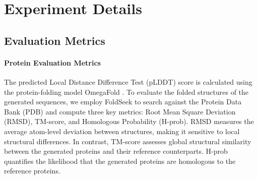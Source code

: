 


\section{Experiment Details}
\subsection{Evaluation Metrics}\label{sec:appendix-metrics}
\paragraph{Protein Evaluation Metrics}
The predicted Local Distance Difference Test (pLDDT) score is calculated using the protein-folding model OmegaFold \citep{OmegaFold}. To evaluate the folded structures of the generated sequences, we employ FoldSeek \citep{vanKempen2024} to search against the Protein Data Bank (PDB) \citep{Berman2000-ql} and compute three key metrics: Root Mean Square Deviation (RMSD), TM-score, and Homologous Probability (H-prob). RMSD measures the average atom-level deviation between structures, making it sensitive to local structural differences. In contrast, TM-score assesses global structural similarity between the generated proteins and their reference counterparts. H-prob quantifies the likelihood that the generated proteins are homologous to the reference proteins.


